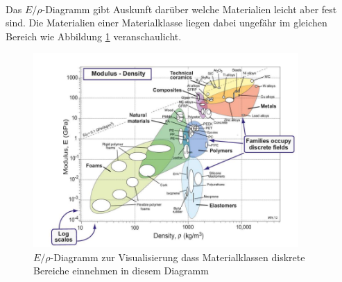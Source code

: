 \documentclass[11pt,a4paper]{article}
\numberwithin{equation}{section}
\numberwithin{figure}{section}
\begin{document}
\\
\begin{addmargin}[25pt]{0pt}
Das $E/\rho$-Diagramm gibt Auskunft darüber welche Materialien leicht aber fest sind. Die Materialien einer Materialklasse liegen dabei ungefähr im gleichen Bereich wie Abbildung \ref{fig:E_Dichte_Diagramm} veranschaulicht.
\end{addmargin}
\begin{figure}[h]
    \centering
    \includegraphics[width = 0.9\textwidth]{images/Materialwissenschaften/E_Dichte_Diagramm.png}
    \caption{$E/\rho$-Diagramm zur Visualisierung dass Materialklassen diskrete Bereiche einnehmen in diesem Diagramm}
    \label{fig:E_Dichte_Diagramm}
\end{figure}
\end{document}
